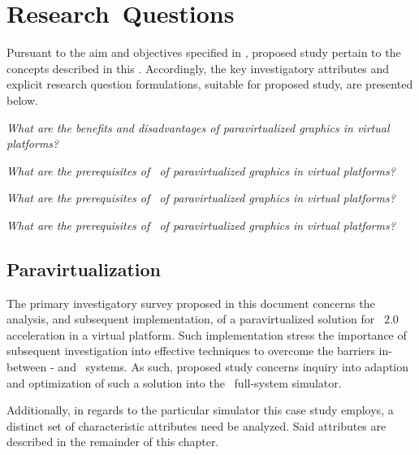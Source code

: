 
\chapter{Research~Questions}
\label{cha:researchquestions}
Pursuant to the aim and objectives specified in , proposed study pertain to the concepts described in this \termcha .
Accordingly, the key investigatory attributes and explicit research question formulations, suitable for proposed study, are presented below.

\newcommand*\researchquestionitem[2]{\item[#1:] \textit{#2}}
\begin{multicols}{2}
\begin{itemize*}
	\researchquestionitem{1}{What are the benefits and disadvantages of paravirtualized graphics in virtual platforms?}
	\researchquestionitem{2}{What are the prerequisites of \termdetexe\  of paravirtualized graphics in virtual platforms?}
	\researchquestionitem{3}{What are the prerequisites of \termcheckpointing\ of paravirtualized graphics in virtual platforms?}
	\researchquestionitem{4}{What are the prerequisites of \termrevexe\ of paravirtualized graphics in virtual platforms?}
\end{itemize*}
\end{multicols}

\section{Paravirtualization}
\label{sec:researchquestions_paravirtualization}
The primary investigatory survey proposed in this document concerns the analysis, and subsequent implementation, of a paravirtualized solution for \termopengles ~$2.0$ acceleration in a virtual platform. Such implementation stress the importance of subsequent investigation into effective techniques to overcome the barriers in-between \termtarget - and \termhost\ systems. As such, proposed study concerns inquiry into adaption and optimization of such a solution into the \termsimics\ full-system simulator.

Additionally, in regards to the particular simulator this case study employs, a distinct set of characteristic attributes need be analyzed. Said attributes are described in the remainder of this chapter.


